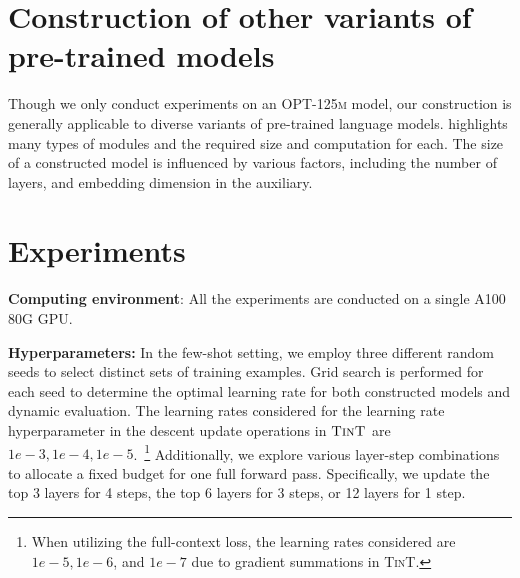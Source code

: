 
\section{Construction of other variants of pre-trained models}\label{app:other_construction}

%
Though we only conduct experiments on an \textsc{OPT-125m} model, our construction is generally applicable to diverse variants of pre-trained language models.
 highlights many types of modules and the required size and computation for each.
The size of a constructed model is influenced by various factors, including the number of layers, and embedding dimension in the auxiliary. 

\section{Experiments}\label{app:experiment}



\textbf{Computing environment}: All the experiments are conducted on a single A100 80G GPU. 

\textbf{Hyperparameters:}
In the few-shot setting, we employ three different random seeds to select distinct sets of training examples. Grid search is performed for each seed to determine the optimal learning rate for both constructed models and dynamic evaluation. The learning rates considered for the learning rate hyperparameter in the descent update operations in $\textsc{TinT}$ are $1e-3, 1e-4, 1e-5$.~\footnote{When utilizing the full-context loss, the learning rates considered are ${1e-5, 1e-6}$, and $1e-7$ due to gradient summations in \textsc{TinT}.} Additionally, we explore various layer-step combinations to allocate a fixed budget for one full forward pass. Specifically, we update the top 3 layers for 4 steps, the top 6 layers for 3 steps, or 12 layers for 1 step.


